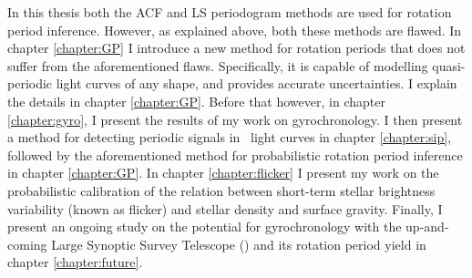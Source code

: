 In this thesis both the ACF and LS periodogram methods are used for rotation
period inference.
However, as explained above, both these methods are flawed.
In chapter \ref{chapter:GP} I introduce a new method for rotation
periods that does not suffer from the aforementioned flaws.
Specifically, it is capable of modelling quasi-periodic light curves of any
shape, and provides accurate uncertainties.
I explain the details in chapter \ref{chapter:GP}.
Before that however, in chapter \ref{chapter:gyro}, I present the results of
my work on gyrochronology.
I then present a method for detecting periodic signals in \ktwo\ light curves
in chapter \ref{chapter:sip}, followed by the aforementioned method for
probabilistic rotation period inference in chapter \ref{chapter:GP}.
In chapter \ref{chapter:flicker} I present my work on the probabilistic
calibration of the relation between short-term stellar brightness variability
(known as flicker) and stellar density and surface gravity.
Finally, I present an ongoing study on the potential for gyrochronology with
the up-and-coming Large Synoptic Survey Telescope (\LSST) and its rotation
period yield in chapter \ref{chapter:future}.
